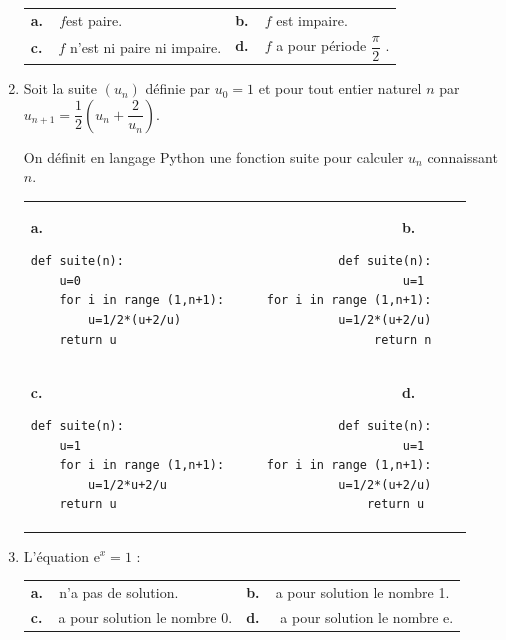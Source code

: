 \documentclass[10pt]{article}
\providecommand{\e}{{\mathrm{e}}}
\begin{document}
\begin{enumerate}
\begin{tabularx}{\linewidth}{*{2}{X}}
\textbf{a.~~}$f $est paire.  &\textbf{b.~~}$f$ est impaire. \\\textbf{c.~~}$f$ n'est ni paire ni impaire.& \textbf{d.~~}$f$ a pour période $\dfrac{\pi}{2}$ .
\end{tabularx}

\item Soit la suite $\left(u_n\right)$ définie par $u_0=1$ et pour tout entier naturel $n$ par $u_{n+1}=\dfrac{1}{2}\left(u_n + \dfrac{2}{u_n}\right)$.

On définit en langage Python une fonction \og suite \fg{} pour calculer $u_n$ connaissant $n$.

\begin{tabular}{*{2}{lr}}
\textbf{a.~~} 
\begin{minipage}[]{0.4\linewidth}
\begin{lstlisting}[style=python]
 def suite(n):
	u=0 
	for i in range (1,n+1):
		u=1/2*(u+2/u) 
	return u
 \end{lstlisting}
\end{minipage} 
 &
\textbf{b.~~}
\begin{minipage}[]{0.4\linewidth}
\begin{lstlisting}[style=python]
 def suite(n):
	u=1 
	for i in range (1,n+1):
		u=1/2*(u+2/u)
	return n
\end{lstlisting}
\end{minipage}\\

\textbf{c.~~}
\begin{minipage}[]{0.4\linewidth}
\begin{lstlisting}[style=python]
 def suite(n):
	u=1
	for i in range (1,n+1):
		u=1/2*u+2/u 
	return u
\end{lstlisting}
\end{minipage}&
\textbf{d.~~}
\begin{minipage}[]{0.4\linewidth}
\begin{lstlisting}[style=python]
 def suite(n):
	u=1 
	for i in range (1,n+1):
		u=1/2*(u+2/u)
	return u 
\end{lstlisting}
\end{minipage}
\end{tabular}

\item L'équation $\e^x=1$ :

\begin{tabularx}{\linewidth}{*{2}{X}}
\textbf{a.~~}n'a pas de solution.  &\textbf{b.~~}a pour solution le nombre 1. \\\textbf{c.~~}a pour solution le nombre 0.& \textbf{d.~~} a pour solution le nombre $\e$.
\end{tabularx}
\end{enumerate}

\vspace{0,5cm}
\end{document}
